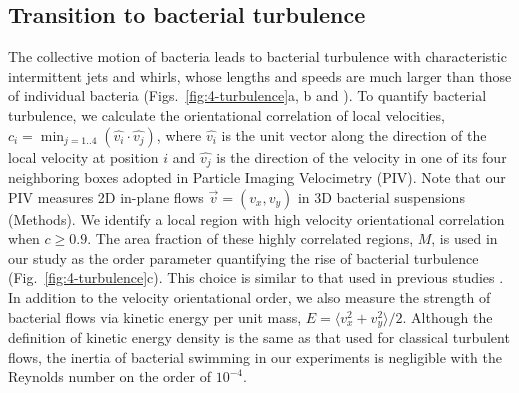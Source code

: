 \subsection{Transition to bacterial turbulence}
The collective motion of bacteria leads to bacterial turbulence with characteristic intermittent jets and whirls, whose lengths and speeds are much larger than those of individual bacteria (Figs.~\ref{fig:4-turbulence}a, b and \textcolor{Movie S1}). To quantify bacterial turbulence, we calculate the orientational correlation of local velocities, $c_i=\min_{j=1..4}(\hat{v_i}\cdot\hat{v_j})$, where $\hat{v_i}$ is the unit vector along the direction of the local velocity at position $i$ and $\hat{v_j}$ is the direction of the velocity in one of its four neighboring boxes adopted in Particle Imaging Velocimetry (PIV).
Note that our PIV measures 2D in-plane flows $\vec{v}=(v_x, v_y)$ in 3D bacterial suspensions (Methods). We identify a local region with high velocity orientational correlation when $c \ge 0.9$. The area fraction of these highly correlated regions, $M$, is used in our study as the order parameter quantifying the rise of bacterial turbulence (Fig.~\ref{fig:4-turbulence}c). This choice is similar to that used in previous studies \cite{Cisneros2011}. In addition to the velocity orientational order, we also measure the strength of bacterial flows via kinetic energy per unit mass, $E=\langle v_x^2 + v_y^2 \rangle / 2$.
Although the definition of kinetic energy density is the same as that used for classical turbulent flows, the inertia of bacterial swimming in our experiments is negligible with the Reynolds number on the order of $10^{-4}$.

